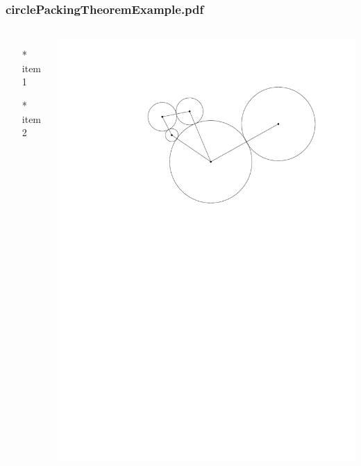 \begin{frame} \frametitle{circlePackingTheoremExample.pdf}
    \begin{columns}[c]
        \begin{itemize}
            \item[*] item 1
            \item[*] item 2
        \end{itemize}
        \begin{minipage}{\linewidth}
            \begin{center}
            \includegraphics[width=.9\textwidth]{graphics/circlePackingTheoremExample.pdf}
            \label{gfx:circlePackingTheoremExample.pdf}
            \end{center}
        \end{minipage}
    \end{columns}
\end{frame}
